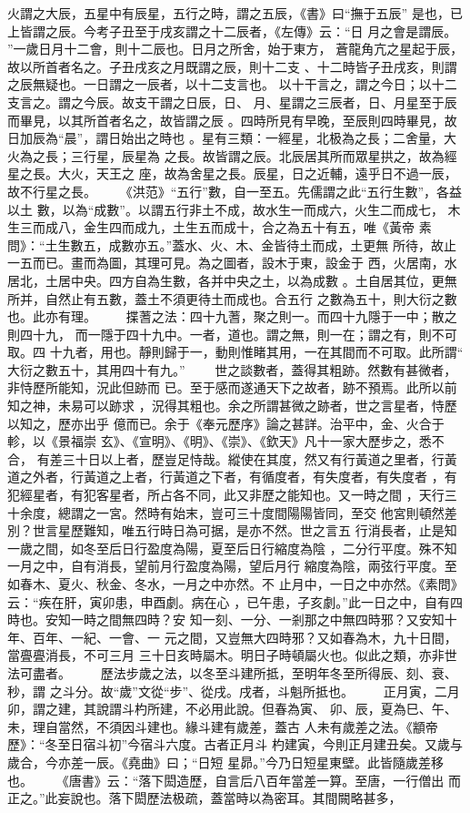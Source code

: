 \documentclass{ctexart}
\begin{document}
火謂之大辰，五星中有辰星，五行之時，謂之五辰，《書》曰``撫于五辰'' 是也，已上皆謂之辰。今考子丑至于戌亥謂之十二辰者，《左傳》云：``日 月之會是謂辰。 ''一歲日月十二會，則十二辰也。日月之所舍，始于東方， 蒼龍角亢之星起于辰，故以所首者名之。子丑戌亥之月既謂之辰，則十二支 、十二時皆子丑戌亥，則謂之辰無疑也。一日謂之一辰者，以十二支言也。 以十干言之，謂之今日；以十二支言之。謂之今辰。故支干謂之日辰，日、 月、星謂之三辰者，日、月星至于辰而畢見，以其所首者名之，故皆謂之辰 。四時所見有早晚，至辰則四時畢見，故日加辰為``晨''，謂日始出之時也 。星有三類：一經星，北极為之長；二舍量，大火為之長；三行星，辰星為 之長。故皆謂之辰。北辰居其所而眾星拱之，故為經星之長。大火，天王之 座，故為舍星之長。辰星，日之近輔，遠乎日不過一辰，故不行星之長。 　　《洪范》``五行''數，自一至五。先儒謂之此``五行生數''，各益以土 數，以為``成數''。以謂五行非土不成，故水生一而成六，火生二而成七， 木生三而成八，金生四而成九，土生五而成十，合之為五十有五，唯《黃帝 素問》：``土生數五，成數亦五。''蓋水、火、木、金皆待土而成，土更無 所待，故止一五而已。畫而為圖，其理可見。為之圖者，設木于東，設金于 西，火居南，水居北，土居中央。四方自為生數，各并中央之土，以為成數 。土自居其位，更無所并，自然止有五數，蓋土不須更待土而成也。合五行 之數為五十，則大衍之數也。此亦有理。 　　揲蓍之法：四十九蓍，聚之則一。而四十九隱于一中；散之則四十九， 而一隱于四十九中。一者，道也。謂之無，則一在；謂之有，則不可取。四 十九者，用也。靜則歸于一，動則惟睹其用，一在其間而不可取。此所謂`` 大衍之數五十，其用四十有九。'' 　　世之談數者，蓋得其粗跡。然數有甚微者，非恃歷所能知，況此但跡而 已。至于感而遂通天下之故者，跡不預焉。此所以前知之神，未易可以跡求 ，況得其粗也。余之所謂甚微之跡者，世之言星者，恃歷以知之，歷亦出乎 億而已。余于《奉元歷序》論之甚詳。治平中，金、火合于軫，以《景福崇 玄》、《宣明》、《明》、《崇》、《欽天》凡十一家大歷步之，悉不合， 有差三十日以上者，歷豈足恃哉。縱使在其度，然又有行黃道之里者，行黃 道之外者，行黃道之上者，行黃道之下者，有循度者，有失度者，有失度者 ，有犯經星者，有犯客星者，所占各不同，此又非歷之能知也。又一時之間 ，天行三十余度，總謂之一宮。然時有始末，豈可三十度間陽陽皆同，至交 他宮則頓然差別？世言星歷難知，唯五行時日為可据，是亦不然。世之言五 行消長者，止是知一歲之間，如冬至后日行盈度為陽，夏至后日行縮度為陰 ，二分行平度。殊不知一月之中，自有消長，望前月行盈度為陽，望后月行 縮度為陰，兩弦行平度。至如春木、夏火、秋金、冬水，一月之中亦然。不 止月中，一日之中亦然。《素問》云：``疾在肝，寅卯患，申酉劇。病在心 ，已午患，子亥劇。''此一日之中，自有四時也。安知一時之間無四時？安 知一刻、一分、一剎那之中無四時邪？又安知十年、百年、一紀、一會、一 元之間，又豈無大四時邪？又如春為木，九十日間，當亹亹消長，不可三月 三十日亥時屬木。明日子時頓屬火也。似此之類，亦非世法可盡者。 　　歷法步歲之法，以冬至斗建所抵，至明年冬至所得辰、刻、衰、秒，謂 之斗分。故``歲''文從``步''、從戌。戌者，斗魁所抵也。 　　正月寅，二月卯，謂之建，其說謂斗杓所建，不必用此說。但春為寅、 卯、辰，夏為巳、午、未，理自當然，不須因斗建也。緣斗建有歲差，蓋古 人未有歲差之法。《顓帝歷》：``冬至日宿斗初''今宿斗六度。古者正月斗 杓建寅，今則正月建丑矣。又歲与歲合，今亦差一辰。《堯曲》曰；``日短 星昴。''今乃日短星東壁。此皆隨歲差移也。 　　《唐書》云：``落下閎造歷，自言后八百年當差一算。至唐，一行僧出 而正之。''此妄說也。落下閎歷法极疏，蓋當時以為密耳。其間闕略甚多， 
\end{document}
